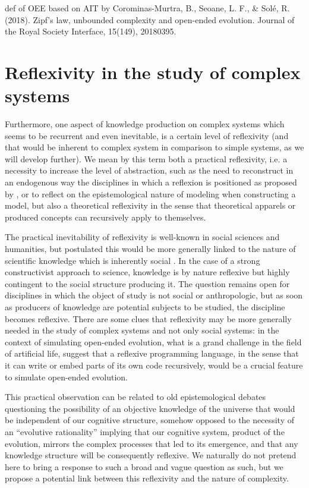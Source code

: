 def of OEE based on AIT by Corominas-Murtra, B., Seoane, L. F., & Solé, R. (2018). Zipf’s law, unbounded complexity and open-ended evolution. Journal of the Royal Society Interface, 15(149), 20180395.


\section{Reflexivity in the study of complex systems}




Furthermore, one aspect of knowledge production on complex systems which seems to be recurrent and even inevitable, is a certain level of reflexivity (and that would be inherent to complex system in comparison to simple systems, as we will develop further). We mean by this term both a practical reflexivity, i.e. a necessity to increase the level of abstraction, such as the need to reconstruct in an endogenous way the disciplines in which a reflexion is positioned as proposed by \cite{2017arXiv171200805R}, or to reflect on the epistemological nature of modeling when constructing a model, but also a theoretical reflexivity in the sense that theoretical apparels or produced concepts can recursively apply to themselves.

The practical inevitability of reflexivity is well-known in social sciences and humanities, but \cite{bourdieu2004science} postulated this would be more generally linked to the nature of scientific knowledge which is inherently social \cite{maton2003reflexivity}. In the case of a strong constructivist approach to science, knowledge is by nature reflexive but highly contingent to the social structure producing it. The question remains open for disciplines in which the object of study is not social or anthropologic, but as soon as producers of knowledge are potential subjects to be studied, the discipline becomes reflexive. There are some clues that reflexivity may be more generally needed in the study of complex systems and not only social systems: in the context of simulating open-ended evolution, what is a grand challenge in the field of artificial life, \cite{banzhaf2016defining} suggest that a reflexive programming language, in the sense that it can write or embed parts of its own code recursively, would be a crucial feature to simulate open-ended evolution.


This practical observation can be related to old epistemological debates questioning the possibility of an objective knowledge of the universe that would be independent of our cognitive structure, somehow opposed to the necessity of an ``evolutive rationality'' implying that our cognitive system, product of the evolution, mirrors the complex processes that led to its emergence, and that any knowledge structure will be consequently reflexive. We naturally do not pretend here to bring a response to such a broad and vague question as such, but we propose a potential link between this reflexivity and the nature of complexity. 







